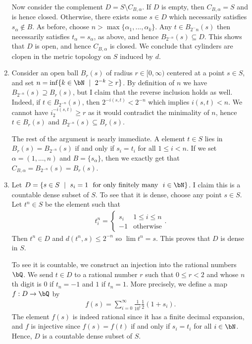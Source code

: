 \begin{homework}[e]
\begin{prf}
\begin{enumerate}[(1)]
			Now consider the complement $D = S \setminus C_{B,\alpha}$. If $D$ is empty, then $C_{B,\alpha} = S$ and is hence closed. Otherwise, there exists some $s \in D$ which necessarily satisfies $s_\alpha \not\in B$. As before, choose $n > \max\{\alpha_1,...,\alpha_k\}$. Any $t \in B_{2^-n}(s)$ then necessarily satisfies $t_\alpha = s_\alpha$, as above, and hence $B_{2^{-n}}(s) \subseteq D$. This shows that $D$ is open, and hence $C_{B,\alpha}$ is closed. We conclude that cylinders are clopen in the metric topology on $S$ induced by $d$.
			\item Consider an open ball $B_{r}(s)$ of radius $r \in [0,\infty)$ centered at a point $s \in S$, and set $n = \inf\{k \in \bN ~\mid~ 2^{-k} \geq r\}$. By definition of $n$ we have $B_{2^{-n}}(s) \supseteq B_{r}(s)$, but I claim that the reverse inclusion holds as well. Indeed, if $t \in B_{2^{-n}}(s)$, then $2^{-i(s,t)} < 2^{-n}$ which implies $i(s,t) < n$. We cannot have $i_2^{-i(s,t)} \geq r$ as it would contradict the minimality of $n$, hence $t \in B_r(s)$ and $B_{2^{-n}}(s) \subseteq B_{r}(s)$.

				The rest of the argument is nearly immediate. A element $t \in S$ lies in $B_r(s) = B_{2^{-n}}(s)$ if and only if $s_i = t_i$ for all $1\leq i<  n$. If we set $\alpha = (1,...,n)$ and $B = \{s_\alpha\}$, then we exactly get that $C_{B,\alpha} = B_{2^{-n}}(s) = B_r(s)$.
			\item Let $D = \{s \in S ~\mid~ s_i = 1 ~\text{ for only finitely many  } ~ i\in \bN\}$. I claim this is a countable dense subset of $S$. To see that it is dense, choose any point $s \in S$. Let $t^n \in S$ be the element such that
				\begin{align*}
					t^n_i = 
					\begin{cases}
						s_i & 1\leq i\leq n \\
						-1 & \text{otherwise}
					\end{cases}.
				\end{align*}
			Then $t^n \in D$ and $d(t^n,s) \leq 2^{-n}$ so $\lim t^n = s$. This proves that $D$ is dense in $S$.

			To see it is countable, we construct an injection into the rational numbers $\bQ$. We send $t \in D$ to a rational number $r$ such that $0 \leq r < 2$ and whose $n$th digit is $0$ if $t_n = -1$ and $1$ if $t_n = 1$. More precisely, we define a map $f:D\to \bQ$ by
			\begin{align*}
				f(s) = \sum_{i=0}^\infty \frac{1}{10^i} \frac{1}{2}(1 + s_i).
			\end{align*}
			The element $f(s)$ is indeed rational since it has a finite decimal expansion, and $f$ is injective since $f(s) = f(t)$ if and only if $s_i = t_i$ for all $i\in \bN$. Hence, $D$ is a countable dense subset of $S$.


\end{enumerate}
\end{prf}
\end{homework}
